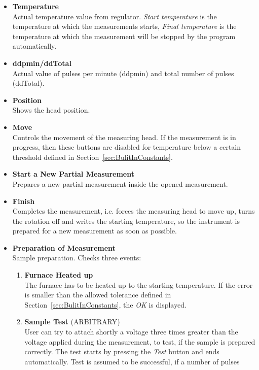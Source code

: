 \documentclass[a4paper,11pt,twoside]{book}
\theoremstyle{named}
\begin{document}
\begin{itemize}
  \item \textbf{Temperature} \\
    Actual temperature value from regulator. \textit{Start temperature} is the
    temperature at which the measurements starts, \textit{Final temperature} is
    the temperature at which the measurement will be stopped by the program
    automatically.
  \item \textbf{ddpmin/ddTotal} \\
    Actual value of pulses per minute (ddpmin) and total number of pulses
    (ddTotal).
  \item \textbf{Position} \\
    Shows the head position.
  \item \textbf{Move} \\
    Controls the movement of the measuring head. If the measurement is in
    progress, then these buttons are disabled for temperature below a certain
    threshold defined in Section~\ref{sec:BulitInConstants}.
  \item \textbf{Start a New Partial Measurement} \\
    Prepares a new partial measurement inside the opened measurement. 
  \item \textbf{Finish} \\
    Completes the measurement, i.e. forces the measuring head to move up, turns
    the rotation off and writes the starting temperature, so the instrument is
    prepared for a new measurement as soon as possible. 
  \item \textbf{Preparation of Measurement} \\
    Sample preparation. Checks three events:
    \begin{enumerate}
      \item \textbf{Furnace Heated up} \\
        The furnace has to be heated up to the starting temperature. If the
        error is smaller than the allowed tolerance defined in
        Section~\ref{sec:BulitInConstants}, the \textit{OK} is displayed.
      \item \textbf{Sample Test} (ARBITRARY) \\
        User can try to attach shortly a voltage three times greater than the
        voltage applied during the measurement, to test, if the sample is prepared
        correctly. The test starts by pressing the \textit{Test} button and ends
        automatically. Test is assumed to be successful, if a number of pulses

\end{enumerate}
\end{itemize}
\end{document}
